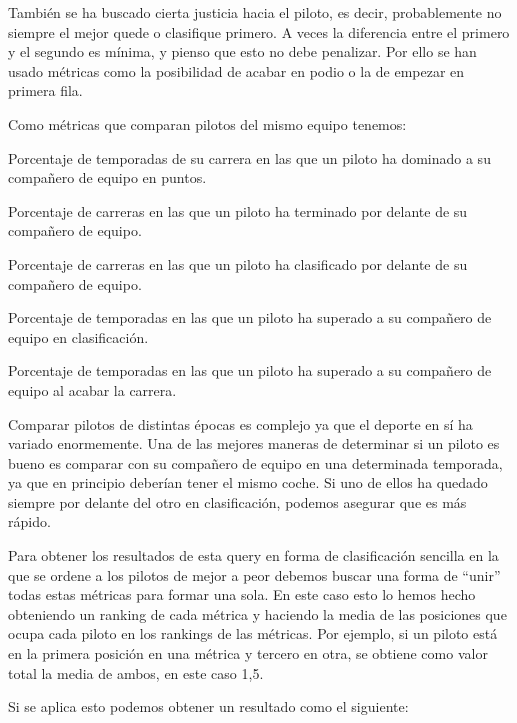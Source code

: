 \documentclass[12pt,twoside,titlepage]{report}
\newcommand{\quotes}[1]{``#1''}
\begin{document}
También se ha buscado cierta justicia hacia el piloto, es decir, probablemente no siempre el mejor quede o clasifique primero. A veces la diferencia entre el primero y el segundo es mínima, y pienso que esto no debe penalizar. Por ello se han usado métricas como la posibilidad de acabar en podio o la de empezar en primera fila.

Como métricas que comparan pilotos del mismo equipo tenemos:
\begin{compactitem}
	\item Porcentaje de temporadas de su carrera en las que un piloto ha dominado a su compañero de equipo en puntos.
	\item Porcentaje de carreras en las que un piloto ha terminado por delante de su compañero de equipo.
	\item Porcentaje de carreras en las que un piloto ha clasificado por delante de su compañero de equipo.
	\item Porcentaje de temporadas en las que un piloto ha superado a su compañero de equipo en clasificación.
	\item Porcentaje de temporadas en las que un piloto ha superado a su compañero de equipo al acabar la carrera.
\end{compactitem}

Comparar pilotos de distintas épocas es complejo ya que el deporte en sí ha variado enormemente. Una de las mejores maneras de determinar si un piloto es bueno es comparar con su compañero de equipo en una determinada temporada, ya que en principio deberían tener el mismo coche. Si uno de ellos ha quedado siempre por delante del otro en clasificación, podemos asegurar que es más rápido.

Para obtener los resultados de esta query en forma de clasificación sencilla en la que se ordene a los pilotos de mejor a peor debemos buscar una forma de \quotes{unir} todas estas métricas para formar una sola. En este caso esto lo hemos hecho obteniendo un ranking de cada métrica y haciendo la media de las posiciones que ocupa cada piloto en los rankings de las métricas. Por ejemplo, si un piloto está en la primera posición en una métrica y tercero en otra, se obtiene como valor total la media de ambos, en este caso 1,5.

Si se aplica esto podemos obtener un resultado como el siguiente:
\end{document}
